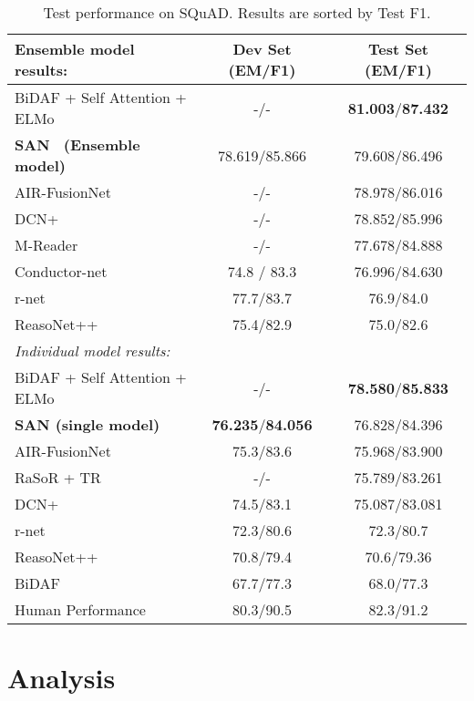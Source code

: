 \documentclass[11pt,a4paper]{article}
\newcommand\DR{SAN }
\begin{document}
\begin{table*}[t!]
\centering
\begin{tabular}{l || c | c  }
\hline
Ensemble model results:&Dev Set (EM/F1)& Test Set (EM/F1) \\ \hline
\hline
BiDAF + Self Attention + ELMo \cite{2018arXiv180205365P} &-/-&\textbf{81.003}/\textbf{87.432} \\ \hline
\textbf{\DR~(Ensemble model)} &78.619/85.866&79.608/86.496 \\ \hline
AIR-FusionNet \cite{huang2017fusionnet} &-/-&78.978/86.016\\ \hline
DCN+ \cite{xiong2017dcn} &-/-& 78.852/85.996\\ \hline
M-Reader \cite{hu2017mnemonic} &-/-&77.678/84.888 \\ \hline
Conductor-net \cite{liu2017phase}&74.8 / 83.3&76.996/84.630 \\ \hline
r-net \cite{wang2017gated}& 77.7/83.7&76.9/84.0\\ \hline
ReasoNet++ \cite{shen2017empirical} & 75.4/82.9&75.0/82.6 \\\hline
\hline
\multicolumn{3}{l}{\textit{Individual model results:}} \\ \cline{1-3}
BiDAF + Self Attention + ELMo\cite{2018arXiv180205365P} &-/-&\textbf{78.580}/\textbf{85.833} \\ \hline
\textbf{\DR (single model)}  &\textbf{76.235}/\textbf{84.056} &76.828/84.396 \\ \hline
AIR-FusionNet\cite{huang2017fusionnet} &75.3/83.6&75.968/83.900\\ \hline
RaSoR + TR \cite{2017arXiv171203609S} &-/-&75.789/83.261 \\ \hline
DCN+\cite{xiong2017dcn} &74.5/83.1& 75.087/83.081\\ \hline
r-net\cite{wang2017gated}& 72.3/80.6&72.3/80.7 \\ \hline

ReasoNet++\cite{shen2017empirical} &70.8/79.4 &70.6/79.36\\ \hline
BiDAF \cite{seo2016bidirectional} &67.7/77.3&68.0/77.3\\ \hline
\hline
Human Performance &80.3/90.5&82.3/91.2\\ \hline
\end{tabular}
\caption{\label{tab:squad_result} Test performance on SQuAD. Results are sorted by Test F1.}
\end{table*}


\section{Analysis}
\label{sec:ana}
\end{document}
